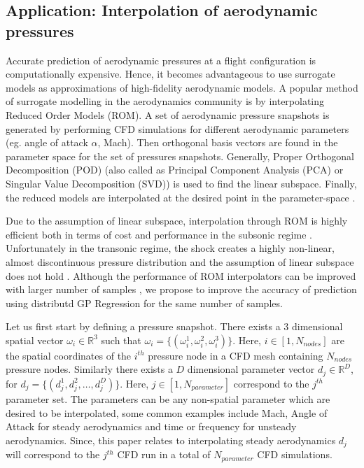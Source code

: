 \subsection{Application: Interpolation of aerodynamic pressures}\label{subecInterpolationOfAerodynamicPressures}
Accurate prediction of aerodynamic pressures at a flight configuration is computationally expensive. Hence, it becomes advantageous to use surrogate models as approximations of high-fidelity aerodynamic models. A popular method of surrogate modelling in the aerodynamics community is by interpolating Reduced Order Models (ROM). A set of aerodynamic pressure snapshots is generated by performing CFD simulations for different aerodynamic parameters (eg. angle of attack $\alpha$, Mach). Then orthogonal basis vectors are found in the parameter space for the set of pressures snapshots. Generally, Proper Orthogonal Decomposition (POD) \cite{tan2003proper, rosenbaum2013efficient, braconnier2011towards} (also called as Principal Component Analysis (PCA) or Singular Value Decomposition (SVD)) is used to find the linear subspace. Finally, the reduced models are interpolated at the desired point in the parameter-space \cite{beckert2001multivariate, barrault2004empirical}. 

Due to the assumption of linear subspace, interpolation through ROM is highly efficient both in terms of cost and performance in the subsonic regime \cite{verveld2016reduced}. Unfortunately in the transonic regime, the shock creates a highly non-linear, almost discontinuous pressure distribution and the assumption of linear subspace does not hold \cite{li2016performance}. Although the performance of ROM interpolators can be improved with larger number of samples \cite{franz2014interpolation, forrester2008engineering}, we propose to improve the accuracy of prediction using distributd GP Regression for the same number of samples.  

Let us first start by defining a pressure snapshot. There exists a \(3\) dimensional spatial vector \(\omega_{i} \in  \mathbb{R}^{3}\) such that \(\omega_{i} = \{(\omega_{i}^{1}, \omega_{i}^{2}, \omega_{i}^{3})\}\). Here, \(i \in [1,N_{nodes}] \) are the spatial coordinates of the \(i^{th}\) pressure node in a CFD mesh containing \(N_{nodes}\) pressure nodes. Similarly there exists a \(D\) dimensional parameter vector \(d_{j} \in  \mathbb{R}^{D}\), for \(d_{j} = \{(d_{j}^{1}, d_{j}^{2}, \ldots ,d_{j}^{D})\}\). Here,   \(j \in [1,N_{parameter}] \) correspond to the \(j^{th}\) parameter set. The parameters can be any non-spatial parameter which are desired to be interpolated, some common examples include Mach, Angle of Attack for steady aerodynamics and time or frequency for unsteady aerodynamics. Since, this paper relates to interpolating steady aerodynamics \(d_{j}\) will correspond to the \(j^{th}\) CFD run in a total of \(N_{parameter}\) CFD simulations. 

